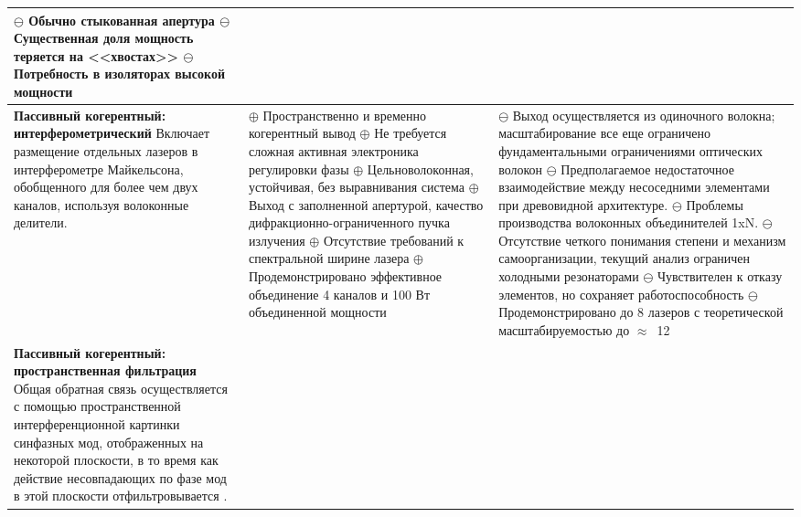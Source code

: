 \begin{longtable}[c]{ | p{4cm} | p{6cm} | p{6cm} |}
      \newline$\ominus$ Обычно стыкованная апертура
      \newline$\ominus$ Существенная доля мощность теряется на <<хвостах>>
      \newline$\ominus$ Потребность в изоляторах высокой мощности
    \\
  \hline
    \textbf{Пассивный когерентный: интерферометрический}
    \newline\newline
    Включает размещение отдельных лазеров в интерферометре Майкельсона, обобщенного для более чем двух каналов, используя волоконные делители.
    &
      $\oplus$ Пространственно и временно когерентный вывод
      \newline$\oplus$ Не требуется сложная активная электроника регулировки фазы
      \newline$\oplus$ Цельноволоконная, устойчивая, без выравнивания система
      \newline$\oplus$ Выход с заполненной апертурой, качество дифракционно-ограниченного пучка излучения
      \newline$\oplus$ Отсутствие требований к спектральной ширине лазера
      \newline$\oplus$ Продемонстрировано эффективное объединение 4 каналов и 100 Вт объединенной мощности
    &
      $\ominus$ Выход осуществляется из одиночного волокна; масштабирование все еще ограничено фундаментальными ограничениями оптических волокон
      \newline$\ominus$ Предполагаемое недостаточное взаимодействие между несоседними элементами при древовидной архитектуре.
      \newline$\ominus$ Проблемы производства волоконных объединителей 1xN.
      \newline$\ominus$ Отсутствие четкого понимания степени и механизм самоорганизации, текущий анализ ограничен холодными резонаторами
      \newline$\ominus$ Чувствителен к отказу элементов, но сохраняет работоспособность
      \newline$\ominus$ Продемонстрировано до 8 лазеров с теоретической масштабируемостью до $\approx$~12
    \\
  \hline
    \textbf{Пассивный когерентный: пространственная фильтрация}
    \newline\newline
    Общая обратная связь осуществляется с помощью пространственной интерференционной картинки синфазных мод, отображенных на некоторой плоскости, в то время как действие несовпадающих по фазе мод в этой плоскости отфильтровывается .

\end{longtable}
